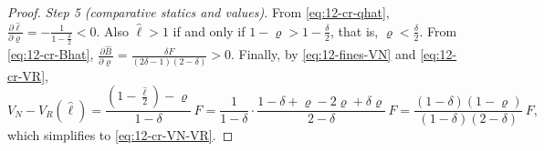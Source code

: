 \begin{proof}
\emph{Step 5 (comparative statics and values).} From \eqref{eq:12-cr-qhat}, $\frac{\partial\hat\ell}{\partial\varrho} =
-\frac{1}{1 - \frac{\delta}{2}} < 0$. Also $\hat\ell > 1$ if and only if $1 - \varrho > 1 - \frac{\delta}{2}$, that
is, $\varrho < \frac{\delta}{2}$. From \eqref{eq:12-cr-Bhat}, $\frac{\partial\hat B}{\partial\varrho} =
\frac{\delta F}{(2\delta-1)(2-\delta)} > 0$. Finally, by \eqref{eq:12-fines-VN} and \eqref{eq:12-cr-VR},
\begin{equation*}
V_N - V_R(\hat\ell) = \frac{\left(1 - \frac{\hat\ell}{2}\right) - \varrho}{1-\delta}\,F
= \frac{1}{1-\delta}\cdot\frac{1 - \delta + \varrho - 2\varrho + \delta\varrho}{2 - \delta}\,F
= \frac{(1-\delta)(1-\varrho)}{(1-\delta)(2-\delta)}\,F,
\end{equation*}
which simplifies to \eqref{eq:12-cr-VN-VR}.
\end{proof}

